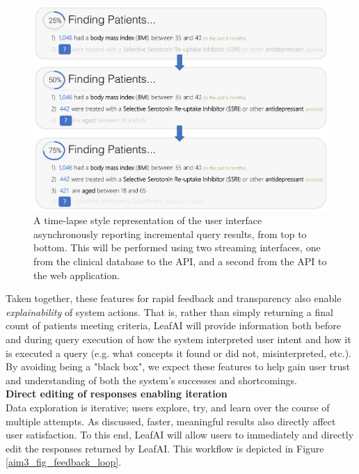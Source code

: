 \documentclass[../main.tex]{subfiles}
\begin{document}
\begin{figure}[h!]
  \centering
  \includegraphics[scale=0.5]{Figures/Aim3/aim3_query_progress.pdf}  
  \caption{A time-lapse style representation of the user interface asynchronously reporting incremental query results, from top to bottom. This will be performed using two streaming interfaces, one from the clinical database to the API, and a second from the API to the web application.}
\label{aim3_fig_query_progress}
\end{figure}

Taken together, these features for rapid feedback and transparency also enable \textit{explainability} of system actions. That is, rather than simply returning a final count of patients meeting criteria, LeafAI will provide information both before and during query execution of how the system interpreted user intent and how it is executed a query (e.g. what concepts it found or did not, misinterpreted, etc.). By avoiding being a "black box", we expect these features to help gain user trust and understanding of both the system's successes and shortcomings. \\

\noindent \textbf{Direct editing of responses enabling iteration} \\
Data exploration is iterative; users explore, try, and learn over the course of multiple attempts. As discussed, faster, meaningful results also directly affect user satisfaction. To this end, LeafAI will allow users to immediately and directly edit the responses returned by LeafAI. This workflow is depicted in Figure \ref{aim3_fig_feedback_loop}. 
\end{document}
